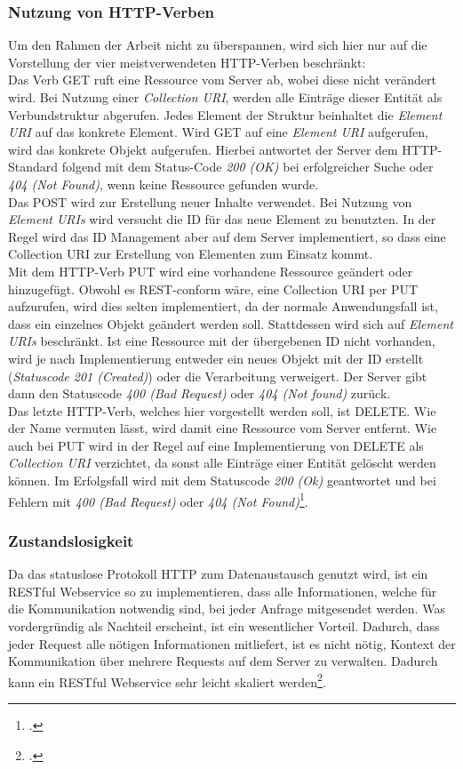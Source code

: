 \subsubsection*{Nutzung von HTTP-Verben}
Um den Rahmen der Arbeit nicht zu überspannen, wird sich hier nur auf die Vorstellung der vier meistverwendeten HTTP-Verben beschränkt:\\
Das Verb GET ruft eine Ressource vom Server ab, wobei diese nicht verändert wird. Bei Nutzung einer \textit{Collection URI}, werden alle Einträge dieser Entität als Verbundstruktur abgerufen. Jedes Element der Struktur beinhaltet die \textit{Element URI} auf das konkrete Element. Wird GET auf eine \textit{Element URI} aufgerufen, wird das konkrete Objekt aufgerufen. Hierbei antwortet der Server dem HTTP-Standard folgend mit dem Status-Code \textit{200 (OK)} bei erfolgreicher Suche oder \textit{404 (Not Found)}, wenn keine Ressource gefunden wurde.\\
Das POST wird zur Erstellung neuer Inhalte verwendet. Bei Nutzung von \textit{Element URIs} wird versucht die ID für das neue Element zu benutzten. In der Regel wird das ID Management aber auf dem Server implementiert, so dass eine Collection URI zur Erstellung von Elementen zum Einsatz kommt.\\
Mit dem HTTP-Verb PUT wird eine vorhandene Ressource geändert oder hinzugefügt. Obwohl es REST-conform wäre, eine Collection URI per PUT aufzurufen, wird dies selten implementiert, da der normale Anwendungsfall ist, dass ein einzelnes Objekt geändert werden soll. Stattdessen wird sich auf \textit{Element URIs} beschränkt. Ist eine Ressource mit der übergebenen ID nicht vorhanden, wird je nach Implementierung entweder ein neues Objekt mit der ID erstellt (\textit{Statuscode 201 (Created)}) oder die Verarbeitung verweigert. Der Server gibt dann den Statuscode \textit{400 (Bad Request)} oder \textit{404 (Not found)}  zurück. \\
Das letzte HTTP-Verb, welches hier vorgestellt werden soll, ist DELETE. Wie der Name vermuten lässt, wird damit eine Ressource vom Server entfernt. Wie auch bei PUT wird in der Regel auf eine Implementierung von DELETE als \textit{Collection URI} verzichtet, da sonst alle Einträge einer Entität gelöscht werden können. Im Erfolgsfall wird mit dem Statuscode \textit{200 (Ok)} geantwortet und bei Fehlern mit \textit{400 (Bad Request)} oder \textit{404 (Not Found)}\footcite[S. 26ff.]{REST-und-HTTP}.
\subsubsection*{Zustandslosigkeit}
Da das statuslose Protokoll HTTP zum Datenaustausch genutzt wird, ist ein RESTful Webservice so zu implementieren, dass alle Informationen, welche für die Kommunikation notwendig sind, bei jeder Anfrage mitgesendet werden. Was vordergründig als Nachteil erscheint, ist ein wesentlicher Vorteil. Dadurch, dass jeder Request alle nötigen Informationen mitliefert, ist es nicht nötig, Kontext der Kommunikation über mehrere Requests auf dem Server zu verwalten. Dadurch kann ein RESTful Webservice sehr leicht skaliert werden\footcite[S. 26ff.]{REST-und-HTTP}.
